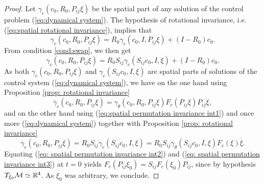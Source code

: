 \begin{proof}
Let $\gamma_c(c_0, R_0, P_{ij} \xi)$ be the spatial part of any solution of the control problem (\ref{eq:dynamical system}). The hypothesis of rotational invariance, i.e. (\ref{eq:spatial rotational invariance}), implies that
\begin{equation}
	\gamma_c(c_0, R_0, P_{ij} \xi) = R_0 \gamma_c(c_0, I, P_{ij} \xi) + (I - R_0)c_0.
\end{equation}
From condition \ref{cond:swap}, we then get
\begin{equation}
\label{eq:spatial permutation invariance int1}
	\gamma_c(c_0, R_0, P_{ij}\xi) = R_0 S_{ij} \gamma_c(S_{ij} c_0, I, \xi) + (I - R_0)c_0.
\end{equation}
As both $\gamma_c(c_0, R_0, P_{ij} \xi)$ and $\gamma_c(S_{ij} c_0, I, \xi)$ are spatial parts of solutions of the control system (\ref{eq:dynamical system}), we have on the one hand using Proposition \ref{prop: rotational invariance}
\begin{equation}
\label{eq: spatial permutation invariance int2}
	\dot{\gamma_c}(c_0, R_0, P_{ij} \xi) = \gamma_{\theta}(c_0, R_0, P_{ij} \xi) F_c(P_{ij} \xi) P_{ij} \dot{\xi},
\end{equation}
and on the other hand using (\ref{eq:spatial permutation invariance int1}) and once more (\ref{eq:dynamical system}) together with Proposition \ref{prop: rotational invariance}
\begin{equation}
\label{eq: spatial permutation invariance int3}
	\dot{\gamma_c}(c_0, R_0, P_{ij} \xi) = R_0 S_{ij} \dot{\gamma}_c(S_{ij} c_0, I, \xi) = R_0 S_{ij} \gamma_\theta(S_{ij} c_0, I, \xi) F_c(\xi) \dot{\xi}.
\end{equation}
Equating (\ref{eq: spatial permutation invariance int2}) and (\ref{eq: spatial permutation invariance int3}) at $t = 0$ yields $ F_c(P_{ij} \xi_0) = S_{ij} F_c(\xi_0) P_{ij}$, since by hypothesis $T_{\xi_0} \mathcal{M} \simeq \mathbb{R}^4$. As $\xi_0$ was arbitrary, we conclude.
\end{proof}

